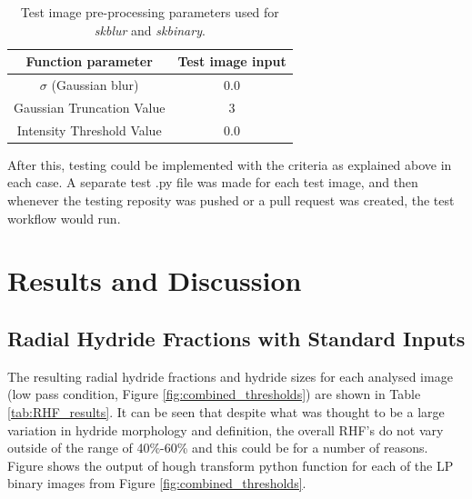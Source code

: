 \documentclass{article}
\begin{document}
    \begin{table}[h]
        \centering
        \begin{tabular}{|c|c|}
        \hline
            \textbf{Function parameter} & \textbf{Test image input}  \\
            \hline
            $\sigma$ (Gaussian blur) & 0.0 \\
            \hline
            Gaussian Truncation Value & 3 \\
            \hline
            Intensity Threshold Value & 0.0 \\ 
        \hline
        \end{tabular}
    \caption{Test image pre-processing parameters used for \textit{skblur} and \textit{skbinary}.}
    \label{tab:TestImageTable}
    \end{table}

    After this, testing could be implemented with the criteria as explained above in each case. A separate test .py file was made for each test image, and then whenever the testing reposity was pushed or a pull request was created, the test workflow would run.

\section{Results and Discussion}
\subsection{Radial Hydride Fractions with Standard Inputs}
    The resulting radial hydride fractions and hydride sizes for each analysed image (low pass condition, Figure \ref{fig:combined_thresholds}) are shown in Table \ref{tab:RHF_results}. It can be seen that despite what was thought to be a large variation in hydride morphology and definition, the overall RHF's do not vary outside of the range of 40\%-60\% and this could be for a number of reasons. Figure shows the output of hough transform python function for each of the LP binary images from Figure \ref{fig:combined_thresholds}.
\end{document}

